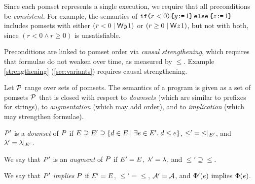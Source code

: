 Since each pomset represents a single execution, we require that all
preconditions be \emph{consistent}.  For example, the semantics of
$\texttt{if}\allowbreak\texttt{(}r<0\texttt{)}\allowbreak\texttt{\{} y\texttt{:}\mkern-1mu\texttt{=}\,1 \texttt{\}}\,\allowbreak\texttt{else}\allowbreak\,\texttt{\{} z\texttt{:}\mkern-1mu\texttt{=}\,1\texttt{\}}$ includes pomsets with either
$(r<0\mid\DW{y}{1})$ or $(r\geq0\mid\DW{z}{1})$, but not with both, since
$(r<0\land r\geq0)$ is unsatisfiable.

Preconditions are linked to pomset order via \emph{causal strengthening},
which requires that formulae do not weaken over time, as measured by $\le$.
Example \ref{strengthening} (\textsection\ref{sec:variants}) requires causal
strengthening. %








Let $\mathcal{P}$ range over sets of pomsets.  The semantics of a program is given
as a set of pomsets $\mathcal{P}$ that is closed with respect to \emph{downsets}
(which are similar to prefixes for strings), to \emph{augmentation} (which
may add order), and to \emph{implication} (which may strengthen formulae).
\begin{definition}
  \label{def:downset}
  $P'$ is a \emph{downset} of $P$ if
  $E \supseteq E' \supseteq \{ d \in E \mid
  \exists e\in E'.\; d\le e\}$, ${\le'}={\le}\mathbin{|}_{E'}$,
  and ${\lambda'}={\lambda}\mathbin{|}_{E'}$.
  
  
  
  We say that
  $P'$ is an \emph{augment} of $P$ if $E'=E$,
  ${\lambda'}={\lambda}$, and ${\le'}\supseteq{\le}$. 
  
  We say that
  $P'$ \emph{implies} $P$ if $E'=E$, ${\le'}={\le}$,
  $\mathcal{A}'=\mathcal{A}$, and $\Phi'(e)$
  implies $\Phi(e)$. 
\end{definition}
 
